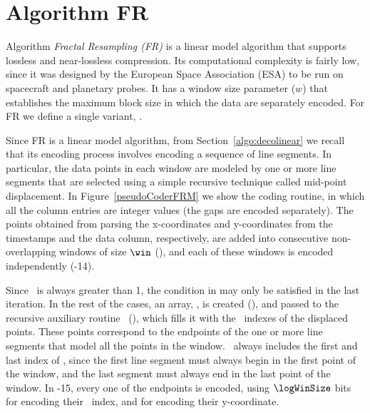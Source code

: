 
\section{Algorithm FR}
\label{algo:fr}

Algorithm \textit{Fractal Resampling (FR)} \cite{coder:fr} is a linear model algorithm that supports lossless and near-lossless compression. Its computational complexity is fairly low, since it was designed by the European Space Association (ESA) to be run on spacecraft and planetary probes. It has a window size parameter ($w$) that establishes the maximum block size in which the data are separately encoded. For FR we define a single variant, \maskalgo.


Since FR is a linear model algorithm, from Section~\ref{algo:decolinear} we recall that its encoding process involves encoding a sequence of line segments. In particular, the data points in each window are modeled by one or more line segments that are selected using a simple recursive technique called mid-point displacement. In Figure~\ref{pseudoCoderFRM} we show the coding routine, in which all the column entries are integer values (the gaps are encoded separately). The points obtained from parsing the x-coordinates and y-coordinates from the timestamps and the data column, respectively, are added into consecutive non-overlapping windows of size $\win$ (), and each of these windows is encoded independently (-14).


Since \win\ is always greater than 1, the condition in  may only be satisfied in the last iteration. In the rest of the cases, an array, \disPoints, is created (), and passed to the recursive auxiliary routine \getDisplacedPointsMethod\ (), which fills it with the \window\ indexes of the displaced points. These points correspond to the endpoints of the one or more line segments that model all the points in the window. \disPoints\ always includes the first and last index of \window, since the first line segment must always begin in the first point of the window, and the last segment must always end in the last point of the window. In -15, every one of the endpoints is encoded, using $\logWinSize$ bits for encoding their \window\ index, and \tobitexp for encoding their y-coordinate.


\clearpage





